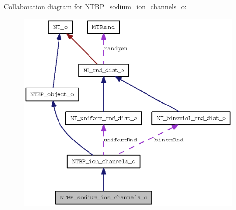 Collaboration diagram for NTBP\_\-sodium\_\-ion\_\-channels\_\-o:
\nopagebreak
\begin{figure}[H]
\begin{center}
\leavevmode
\includegraphics[width=385pt]{class_n_t_b_p__sodium__ion__channels__o__coll__graph}
\end{center}
\end{figure}
